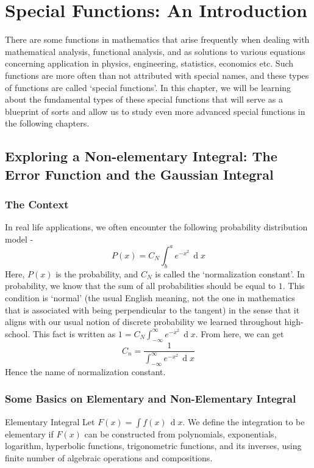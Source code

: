 \chapter{Special Functions: An Introduction}
There are some functions in mathematics that arise frequently when dealing with mathematical analysis, functional analysis, and as solutions to various equations concerning application in physics, engineering, statistics, economics etc. Such functions are more often than not attributed with special names, and these types of functions are called `special functions'. In this chapter, we will be learning about the fundamental types of these special functions that will serve as a blueprint of sorts and allow us to study even more advanced special functions in the following chapters.
\section{Exploring a Non-elementary Integral: The Error Function and the Gaussian Integral}
\subsection{The Context}
In real life applications, we often encounter the following probability distribution model - $$ P(x)=C_{N}\int_{b}^{a}e^{-x^2}\,\operatorname{d}x$$ Here, $P(x)$ is the probability, and $C_N$ is called the `normalization constant'. In probability, we know that the sum of all probabilities should be equal to $1$. This condition is `normal' (the usual English meaning, not the one in mathematics that is associated with being perpendicular to the tangent) in the sense that it aligns with our usual notion of discrete probability we learned throughout high-school. This fact is written as $ 1=C_N\int_{-\infty}^{\infty}e^{-x^2}\,\operatorname{d}x $. From here, we can get $$ C_n=\frac{1}{\int_{-\infty}^{\infty}e^{-x^2}\,\operatorname{d}x} $$ Hence the name of normalization constant.
\subsection{Some Basics on Elementary and Non-Elementary Integral}
\begin{Definition}{Elementary Integral}\label{elementary_integral}
	Let $F(x)=\int f(x)\,\operatorname{d}x$. We define the integration to be elementary if $F(x)$ can be constructed from polynomials, exponentials, logarithm, hyperbolic functions, trigonometric functions, and its inverses, using finite number of algebraic operations and compositions.
\end{Definition}
